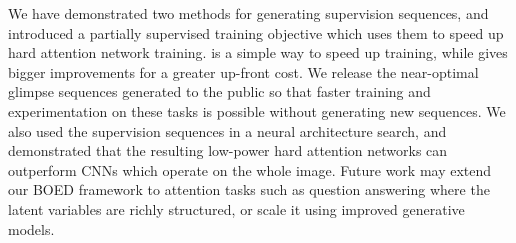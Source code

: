 We have demonstrated two methods for generating supervision sequences, and
introduced a partially supervised training objective which uses them to speed up
hard attention network training. \PSRAM{} is a simple way to speed up training,
while \PSNOGS{} gives bigger improvements for a greater up-front cost. We
release the near-optimal glimpse sequences generated to the public so that
faster training and experimentation on these tasks is possible without
generating new sequences. We also used the supervision sequences in a neural
architecture search, and demonstrated that the resulting low-power hard
attention networks can outperform CNNs which operate on the whole image. Future
work may extend our BOED framework to attention tasks such as question answering
where the latent variables are richly structured, or scale it using improved
generative models.
